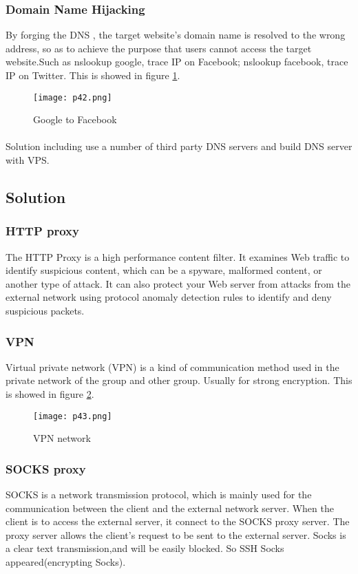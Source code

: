 \documentclass[paper=a4, fontsize=11pt]{scrartcl}
\numberwithin{equation}{section}
\numberwithin{figure}{section}
\numberwithin{table}{section}
\begin{document}
\subsubsection{Domain Name Hijacking}
By forging the DNS , the target website's domain name is resolved to the wrong address, so as to achieve the purpose that users cannot access the target website.Such as nslookup google, trace IP on Facebook; nslookup  facebook, trace IP on Twitter. This is showed in figure \ref{p42}.
\begin{figure}[!htb]
\centering
\texttt{[image: p42.png]}
\caption{Google to Facebook}
\label{p42}
\end{figure}
\paragraph{} 
Solution including use a number of third party DNS servers and build DNS server with VPS.
\subsection{Solution}
\subsubsection{HTTP proxy}
The HTTP Proxy is a high performance content filter. It examines Web traffic to identify suspicious content, which can be a spyware, malformed content, or another type of attack. \cite{cn10} It can also protect your Web server from attacks from the external network using protocol anomaly detection rules to identify and deny suspicious packets.
\subsubsection{VPN}
Virtual private network (VPN) is a kind of communication method used in the private network of the group and other group. Usually for strong encryption. This is showed in figure \ref{p43}.
\begin{figure}[!htb]
\centering
\texttt{[image: p43.png]}
\caption{VPN network}
\label{p43}
\end{figure}
\subsubsection{SOCKS proxy}
SOCKS is a network transmission protocol, which is mainly used for the communication between the client and the external network server.
When the client is to access the external server, it connect to the SOCKS proxy server. The proxy server allows the client's request to be sent to the external server.
Socks is a clear text transmission,and will be easily blocked. So SSH Socks appeared(encrypting Socks).
\end{document}
